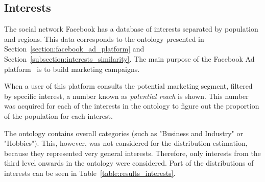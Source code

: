 \subsection{Interests} 

The social network Facebook has a database of interests separated by population and regions. This data corresponds to the ontology presented in Section~\ref{section:facebook_ad_platform} and Section~\ref{subsection:interests_similarity}. The main purpose of the Facebook Ad platform~\cite{facebook_business} is to build marketing campaigns.

When a user of this platform consults the potential marketing segment, filtered by specific interest, a number known as \textit{potential reach} is shown. This number was acquired for each of the interests in the ontology to figure out the proportion of the population for each interest.

The ontology contains overall categories (such as "Business and Industry" or "Hobbies"). This, however, was not considered for the distribution estimation, because they represented very general interests. Therefore, only interests from the third level onwards in the ontology were considered. Part of the distributions of interests can be seen in Table~\ref{table:results_interests}. 

